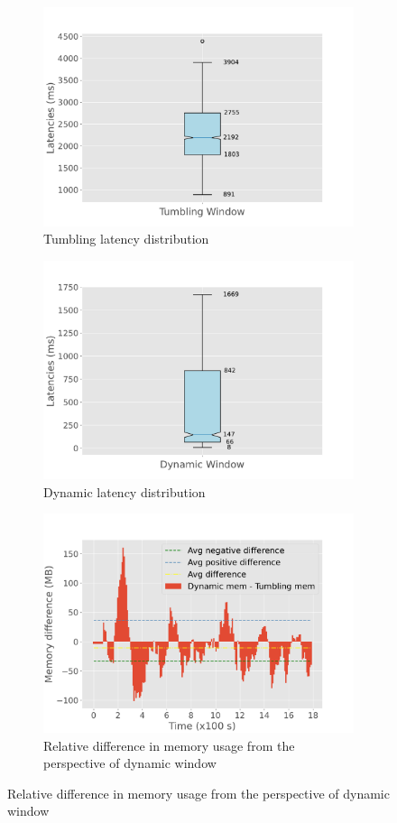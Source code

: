 \begin{figure}
\begin{subfigure}[b]{0.5\columnwidth}
        \includegraphics[width=\columnwidth]{fig/periodic/TumblingWindow_latency_boxplot.pdf}
        \caption{Tumbling latency distribution}
        \label{fig:periodic_tumb_boxplot}
    \end{subfigure}
    \hfill 
    \begin{subfigure}[b]{0.5\columnwidth}
        \includegraphics[width=\columnwidth]{fig/periodic/DynamicWindow_latency_boxplot.pdf}
        \caption{Dynamic latency distribution}
        \label{fig:periodic_dynamic_boxplot}
    \end{subfigure}
    \begin{subfigure}[b]{\columnwidth}
        \centering
        \includegraphics[width=0.5\columnwidth]{fig/periodic/mem_difference_bar.pdf}
        \caption{Relative difference in memory usage from the perspective of dynamic window}
        \label{fig:periodic_mem_diff}
    \end{subfigure}


\end{figure}
